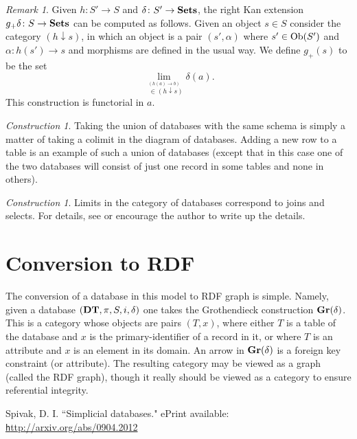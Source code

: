 \documentclass{amsart}
\def\tn{\textnormal}
\def\Ob{\tn{Ob}}
\def\to{\rightarrow}
\def\taking{\colon}
\def\Sets{{\bf Sets}}
\theoremstyle{remark}
\newtheorem{remark}[theorem]{Remark}
\newtheorem{construction}[theorem]{Construction}
\theoremstyle{definition}
\def\Gr{{\bf Gr}}
\def\DT{{\bf DT}}
\begin{document}
\begin{remark}

Given $h\taking S'\to S$ and $\delta\taking S'\to\Sets$, the right Kan extension $g_+\delta\taking S\to\Sets$ can be computed as follows.  Given an object $s\in S$ consider the category $(h\downarrow s)$, in which an object is a pair $(s',\alpha)$ where $s'\in\Ob(S')$ and $\alpha\taking h(s')\to s$ and morphisms are defined in the usual way.  We define $g_+(s)$ to be the set $$\lim_{\stackrel{(h(a)\to b)}{\;\;\in(h\downarrow s)}}\delta(a).$$  This construction is functorial in $a$.

\end{remark}

\begin{construction}

Taking the union of databases with the same schema is simply a matter of taking a colimit in the diagram of databases.  Adding a new row to a table is an example of such a union of databases (except that in this case one of the two databases will consist of just one record in some tables and none in others).

\end{construction}

\begin{construction}

Limits in the category of databases correspond to joins and selects.  For details, see \cite{SD} or encourage the author to write up the details.

\end{construction}

\section{Conversion to RDF}

The conversion of a database in this model to RDF graph is simple.  Namely, given a database $(\DT,\pi,S,i,\delta)$ one takes the Grothendieck construction $\Gr(\delta)$.  This is a category whose objects are pairs $(T,x)$, where either $T$ is a table of the database and $x$ is the primary-identifier of a record in it, or where $T$ is an attribute and $x$ is an element in its domain.  An arrow in $\Gr(\delta)$ is a foreign key constraint (or attribute).  The resulting category may be viewed as a graph (called the RDF graph), though it really should be viewed as a category to ensure referential integrity.


\begin{thebibliography}{JTT}

Spivak, D. I.  ``Simplicial databases."  ePrint available: \href{http://arxiv.org/abs/0904.2012}{\texttt http://arxiv.org/abs/0904.2012}


\end{thebibliography}
\end{document}
